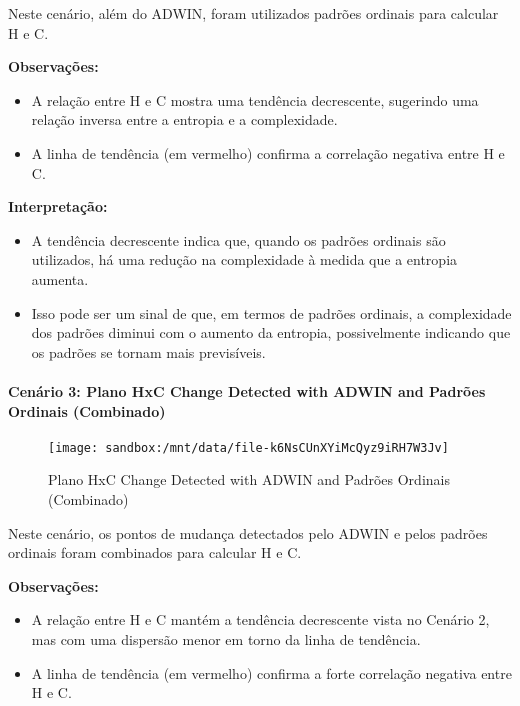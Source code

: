 \documentclass[
]{article}
\begin{document}
Neste cenário, além do ADWIN, foram utilizados padrões ordinais para
calcular H e C.

\textbf{Observações:}

\begin{itemize}
\item
  A relação entre H e C mostra uma tendência decrescente, sugerindo uma
  relação inversa entre a entropia e a complexidade.
\item
  A linha de tendência (em vermelho) confirma a correlação negativa
  entre H e C.
\end{itemize}

\textbf{Interpretação:}

\begin{itemize}
\item
  A tendência decrescente indica que, quando os padrões ordinais são
  utilizados, há uma redução na complexidade à medida que a entropia
  aumenta.
\item
  Isso pode ser um sinal de que, em termos de padrões ordinais, a
  complexidade dos padrões diminui com o aumento da entropia,
  possivelmente indicando que os padrões se tornam mais previsíveis.
\end{itemize}

\hypertarget{cenuxe1rio-3-plano-hxc-change-detected-with-adwin-and-padruxf5es-ordinais-combinado}{%
\paragraph{Cenário 3: Plano HxC Change Detected with ADWIN and Padrões
Ordinais
(Combinado)}\label{cenuxe1rio-3-plano-hxc-change-detected-with-adwin-and-padruxf5es-ordinais-combinado}}

\begin{figure}
\centering
\texttt{[image: sandbox:/mnt/data/file-k6NsCUnXYiMcQyz9iRH7W3Jv]}
\caption{Plano HxC Change Detected with ADWIN and Padrões Ordinais
(Combinado)}
\end{figure}

Neste cenário, os pontos de mudança detectados pelo ADWIN e pelos
padrões ordinais foram combinados para calcular H e C.

\textbf{Observações:}

\begin{itemize}
\item
  A relação entre H e C mantém a tendência decrescente vista no Cenário
  2, mas com uma dispersão menor em torno da linha de tendência.
\item
  A linha de tendência (em vermelho) confirma a forte correlação
  negativa entre H e C.
\end{itemize}
\end{document}
